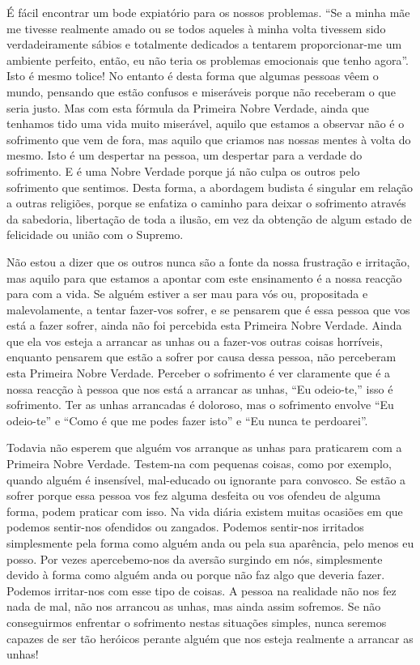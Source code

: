É fácil encontrar um bode expiatório para os nossos problemas. “Se a minha mãe
me tivesse realmente amado ou se todos aqueles à minha volta tivessem sido
verdadeiramente sábios e totalmente dedicados a tentarem proporcionar-me um
ambiente perfeito, então, eu não teria os problemas emocionais que tenho agora”.
Isto é mesmo tolice! No entanto é desta forma que algumas pessoas vêem o mundo,
pensando que estão confusos e miseráveis porque não receberam o que seria justo.
Mas com esta fórmula da Primeira Nobre Verdade, ainda que tenhamos tido uma vida
muito miserável, aquilo que estamos a observar não é o sofrimento que vem de
fora, mas aquilo que criamos nas nossas mentes à volta do mesmo. Isto é um
despertar na pessoa, um despertar para a verdade do sofrimento. E é uma Nobre
Verdade porque já não culpa os outros pelo sofrimento que sentimos. Desta forma,
a abordagem budista é singular em relação a outras religiões, porque se enfatiza
o caminho para deixar o sofrimento através da sabedoria, libertação de toda a
ilusão, em vez da obtenção de algum estado de felicidade ou união com o Supremo.

Não estou a dizer que os outros nunca são a fonte da nossa frustração e
irritação, mas aquilo para que estamos a apontar com este ensinamento é a nossa
reacção para com a vida. Se alguém estiver a ser mau para vós ou, propositada e
malevolamente, a tentar fazer-vos sofrer, e se pensarem que é essa pessoa que
vos está a fazer sofrer, ainda não foi percebida esta Primeira Nobre Verdade.
Ainda que ela vos esteja a arrancar as unhas ou a fazer-vos outras coisas
horríveis, enquanto pensarem que estão a sofrer por causa dessa pessoa, não
perceberam esta Primeira Nobre Verdade. Perceber o sofrimento é ver claramente
que é a nossa reacção à pessoa que nos está a arrancar as unhas, “Eu odeio-te,”
isso é sofrimento. Ter as unhas arrancadas é doloroso, mas o sofrimento envolve
“Eu odeio-te” e “Como é que me podes fazer isto” e “Eu nunca te perdoarei”.

Todavia não esperem que alguém vos arranque as unhas para praticarem com a
Primeira Nobre Verdade. Testem-na com pequenas coisas, como por exemplo, quando
alguém é insensível, mal-educado ou ignorante para convosco. Se estão a sofrer
porque essa pessoa vos fez alguma desfeita ou vos ofendeu de alguma forma, podem
praticar com isso. Na vida diária existem muitas ocasiões em que podemos
sentir-nos ofendidos ou zangados. Podemos sentir-nos irritados simplesmente pela
forma como alguém anda ou pela sua aparência, pelo menos eu posso. Por vezes
apercebemo-nos da aversão surgindo em nós, simplesmente devido à forma como
alguém anda ou porque não faz algo que deveria fazer. Podemos irritar-nos com
esse tipo de coisas. A pessoa na realidade não nos fez nada de mal, não nos
arrancou as unhas, mas ainda assim sofremos. Se não conseguirmos enfrentar o
sofrimento nestas situações simples, nunca seremos capazes de ser tão heróicos
perante alguém que nos esteja realmente a arrancar as unhas!

